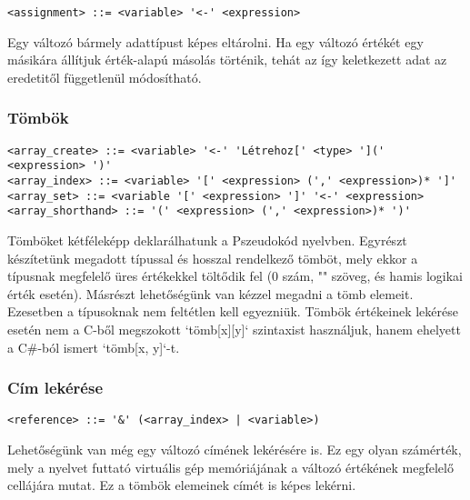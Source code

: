 \begin{footnotesize}
\begin{verbatim}
<assignment> ::= <variable> '<-' <expression>
\end{verbatim}
\end{footnotesize}

Egy változó bármely adattípust képes eltárolni. Ha egy változó értékét egy másikára állítjuk érték-alapú másolás történik, tehát az így keletkezett adat az eredetitől függetlenül módosítható.

\subsubsection{Tömbök}

\begin{footnotesize}
\begin{verbatim}
<array_create> ::= <variable> '<-' 'Létrehoz[' <type> '](' <expression> ')'
<array_index> ::= <variable> '[' <expression> (',' <expression>)* ']'
<array_set> ::= <variable '[' <expression> ']' '<-' <expression>
<array_shorthand> ::= '(' <expression> (',' <expression>)* ')'
\end{verbatim}
\end{footnotesize}

Tömböket kétféleképp deklarálhatunk a Pszeudokód nyelvben. Egyrészt készítetünk megadott típussal és hosszal rendelkező tömböt, mely ekkor a típusnak megfelelő üres értékekkel töltődik fel (0 szám, "" szöveg, és hamis logikai érték esetén). Másrészt lehetőségünk van kézzel megadni a tömb elemeit. Ezesetben a típusoknak nem feltétlen kell egyezniük. Tömbök értékeinek lekérése esetén nem a C-ből megszokott `tömb[x][y]` szintaxist használjuk, hanem ehelyett a C\#-ból ismert `tömb[x, y]`-t.

\subsubsection{Cím lekérése}

\begin{footnotesize}
\begin{verbatim}
<reference> ::= '&' (<array_index> | <variable>)
\end{verbatim}
\end{footnotesize}

Lehetőségünk van még egy változó címének lekérésére is. Ez egy olyan számérték, mely a nyelvet futtató virtuális gép memóriájának a változó értékének megfelelő cellájára mutat. Ez a tömbök elemeinek címét is képes lekérni.

